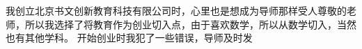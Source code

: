 \documentclass[12pt,twiside,a4paper]{ctexbook}
\numberwithin{chapter}{part}
\begin{document}
我创立北京书文创新教育科技有限公司时，心里也是想成为导师那样受人尊敬的老师，所以我选择了将教育作为创业切入点，由于喜欢数学，所以从数学切入，当然也有其他学科。    开始创业时我犯了一些错误，导师及时发
\end{document}
